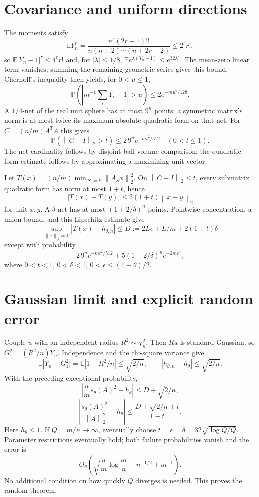 \documentclass[11pt]{article}
\newcommand{\norm}[1]{\left\lVert#1\right\rVert}
\newcommand{\E}{\mathbb E}
\newcommand{\Prob}{\mathbb P}
\begin{document}
\section{Covariance and uniform directions}
The moments satisfy
\[
\E Y_n^r=\frac{n^r(2r-1)!!}{n(n+2)\cdots(n+2r-2)}\le2^r r!,
\]
so $\E|Y_n-1|^r\le4^r r!$ and, for $|\lambda|\le1/8$, $\E e^{\lambda(Y_n-1)}\le e^{32\lambda^2}$. The mean-zero linear term vanishes; summing the remaining geometric series gives this bound. Chernoff's inequality then yields, for $0<u\le1$,
\[
\Prob\left(\left|m^{-1}\sum_iY_i-1\right|>u\right)\le2e^{-mu^2/128}.
\]
A $1/4$-net of the real unit sphere has at most $9^n$ points; a symmetric matrix's norm is at most twice its maximum absolute quadratic form on that net. For $C=(n/m)A^TA$ this gives
\[\Prob(\norm{C-I}_2>t)\le2\,9^n e^{-mt^2/512}\quad(0<t\le1).\]
The net cardinality follows by disjoint-ball volume comparison; the quadratic-form estimate follows by approximating a maximizing unit vector.

Let $T(x)=(n/m)\min_{|S|=k}\norm{A_Sx}_2^2$. On $\norm{C-I}_2\le t$, every submatrix quadratic form has norm at most $1+t$, hence
\[|T(x)-T(y)|\le2(1+t)\norm{x-y}_2\]
for unit $x,y$. A $\delta$-net has at most $(1+2/\delta)^n$ points. Pointwise concentration, a union bound, and this Lipschitz estimate give
\[
\sup_{\norm x_2=1}|T(x)-h_{\theta,n}|\le D:=2L\epsilon+L/m+2(1+t)\delta
\]
except with probability
\[
2\,9^n e^{-mt^2/512}+5(1+2/\delta)^n e^{-2m\epsilon^2},
\]
where $0<t<1$, $0<\delta<1$, $0<\epsilon\le(1-\theta)/2$.
\section{Gaussian limit and explicit random error}
Couple $u$ with an independent radius $R^2\sim\chi_n^2$. Then $Ru$ is standard Gaussian, so $G_1^2=(R^2/n)Y_n$. Independence and the chi-square variance give
\[
\E|Y_n-G_1^2|=\E|1-R^2/n|\le\sqrt{2/n},\qquad
|h_{\theta,n}-h_\theta|\le\sqrt{2/n}.
\]
With the preceding exceptional probability,
\[
\left|\frac nm s_\theta(A)^2-h_\theta\right|\le D+\sqrt{2/n},
\]
\[
\left|\frac{s_\theta(A)^2}{\norm A_2^2}-h_\theta\right|
\le\frac{D+\sqrt{2/n}+t}{1-t}.
\]
Here $h_\theta\le1$. If $Q=m/n\to\infty$, eventually choose $t=\epsilon=\delta=32\sqrt{\log Q/Q}$. Parameter restrictions eventually hold; both failure probabilities vanish and the error is
\[
O_\theta\left(\sqrt{\frac nm\log\frac mn}+n^{-1/2}+m^{-1}\right).
\]
No additional condition on how quickly $Q$ diverges is needed. This proves the random theorem.
\end{document}
